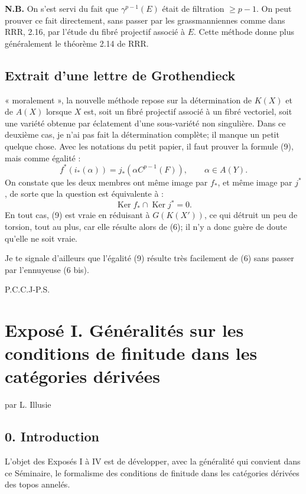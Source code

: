 \documentclass[11pt]{article}
\newcommand{\RRR}{\mathrm{RRR}}
\providecommand{\Ker}{\operatorname{Ker}}
\begin{document}
\textbf{N.B.} On s'est servi du fait que \(\gamma^{p-1}(E)\) était de filtration \(\geq p-1\). On peut prouver ce fait directement, sans passer par les grassmanniennes comme dans \(\RRR\), 2.16, par l'étude du fibré projectif associé à \(E\). Cette méthode donne plus généralement le théorème 2.14 de \(\RRR\).

\subsection*{Extrait d'une lettre de Grothendieck}
« moralement », la nouvelle méthode repose sur la détermination de \(K(X)\) et de \(A(X)\) lorsque \(X\) est, soit un fibré projectif associé à un fibré vectoriel, soit une variété obtenue par éclatement d'une sous-variété non singulière. Dans ce deuxième cas, je n'ai pas fait la détermination complète; il manque un petit quelque chose. Avec les notations du petit papier, il faut prouver la formule (9), mais comme égalité :
\begin{equation}\tag{9}
  f^*(i_*(\alpha))=j_*(\alpha C^{p-1}(F)),\qquad \alpha\in A(Y).
\end{equation}
On constate que les deux membres ont même image par \(f_*\), et même image par \(j^*\), de sorte que la question est équivalente à :
\begin{equation}\tag{9 bis}
  \Ker f_*\cap\Ker j^*=0.
\end{equation}
En tout cas, (9) est vraie en réduisant à \(G(K(X'))\), ce qui détruit un peu de torsion, tout au plus, car elle résulte alors de (6); il n'y a donc guère de doute qu'elle ne soit vraie.

Je te signale d'ailleurs que l'égalité (9) résulte très facilement de (6) sans passer par l'ennuyeuse (6 bis).

\begin{flushleft}
P.C.C.J-P.S.
\end{flushleft}

\newpage
\section*{Exposé I. Généralités sur les conditions de finitude dans les catégories dérivées}
\begin{center}
par L. Illusie
\end{center}

\subsection*{0. Introduction}
L'objet des Exposés I à IV est de développer, avec la généralité qui convient dans ce Séminaire, le formalisme des conditions de finitude dans les catégories dérivées des topos annelés.
\end{document}
